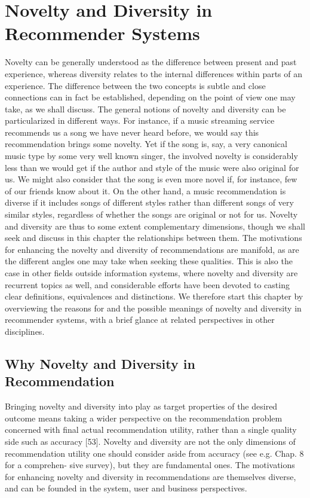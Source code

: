 \section{Novelty and Diversity in Recommender Systems}

Novelty can be generally understood as the difference between present and past experience, whereas diversity relates to the internal differences within parts of an experience. The difference between the two concepts is subtle and close connections can in fact be established, depending on the point of view one may take, as we shall discuss. The general notions of novelty and diversity can be particularized in different ways. For instance, if a music streaming service recommends us a song we have never heard before, we would say this recommendation brings some novelty. Yet if the song is, say, a very canonical music type by some very well known singer, the involved novelty is considerably less than we would get if the author and style of the music were also original for us. We might also consider that the song is even more novel if, for instance, few of our friends know about it. On the other hand, a music recommendation is diverse if it includes songs of different styles rather than different songs of very similar styles, regardless of whether the songs are original or not for us. Novelty and diversity are thus to some extent complementary dimensions, though we shall seek and discuss in this chapter the relationships between them.
The motivations for enhancing the novelty and diversity of recommendations are manifold, as are the different angles one may take when seeking these qualities. This is also the case in other fields outside information systems, where novelty and diversity are recurrent topics as well, and considerable efforts have been devoted to casting clear definitions, equivalences and distinctions. We therefore start this chapter by overviewing the reasons for and the possible meanings of novelty and diversity in recommender systems, with a brief glance at related perspectives in other disciplines.

\subsection{Why Novelty and Diversity in Recommendation}

Bringing novelty and diversity into play as target properties of the desired outcome means taking a wider perspective on the recommendation problem concerned with final actual recommendation utility, rather than a single quality side such as accuracy [53]. Novelty and diversity are not the only dimensions of recommendation utility one should consider aside from accuracy (see e.g. Chap. 8 for a comprehen- sive survey), but they are fundamental ones. The motivations for enhancing novelty and diversity in recommendations are themselves diverse, and can be founded in the system, user and business perspectives.


